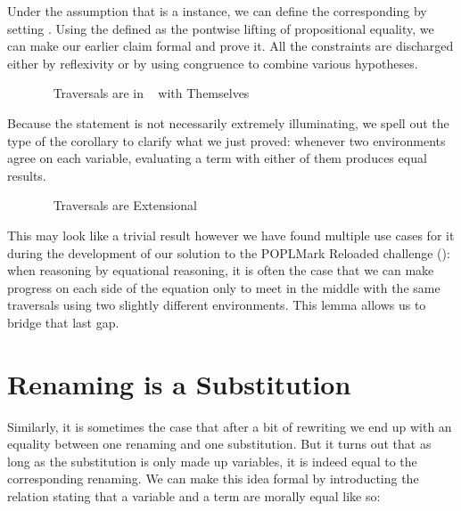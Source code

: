 Under the assumption that  is a  instance, we can define the
corresponding   by setting
.
Using  the  defined as the pontwise lifting of propositional equality,
we can make our earlier claim formal and prove it. All the constraints are discharged
either by reflexivity or by using congruence to combine various hypotheses.

\begin{figure}[h]
\caption{~ Traversals are in ~ with Themselves\label{fig:synselfsim}}
\end{figure}

Because the  statement is not necessarily extremely illuminating, we spell
out the type of the corollary to clarify what we just proved: whenever two environments
agree on each variable, evaluating a term with either of them produces equal results.

\begin{figure}[h]
\caption{~ Traversals are Extensional\label{fig:synextensional}}
\end{figure}

This may look like a trivial result however we have found multiple use cases for it
during the development of our solution to the POPLMark Reloaded challenge (\citeyear{poplmark2}):
when reasoning by equational reasoning, it is often the case that we can make progress
on each side of the equation only to meet in the middle with the same traversals using
two slightly different environments. This lemma allows us to bridge that last gap.

\section{Renaming is a Substitution}

Similarly, it is sometimes the case that after a bit of rewriting we end up with an
equality between one renaming and one substitution. But it turns out that as long as
the substitution is only made up variables, it is indeed equal to the corresponding
renaming. We can make this idea formal by introducting the  relation
stating that a variable and a term are morally equal like so:

